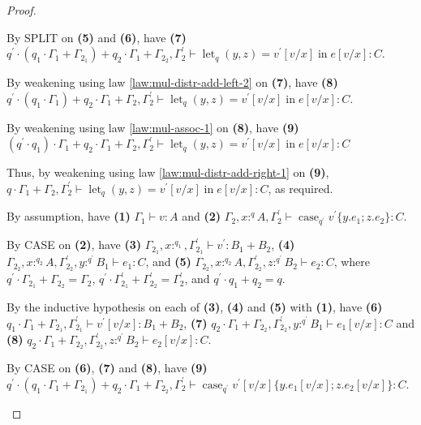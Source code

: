 \documentclass[acmsmall,screen,nonacm]{acmart}
\DeclareMathOperator{\llet}{\text{let}}
\DeclareMathOperator{\lin}{\text{in}}
\DeclareMathOperator{\case}{\text{case}}
\newcommand{\tee}{\vdash}
\begin{document}
\begin{proof}
\begin{description}
    By SPLIT on \textbf{(5)} and \textbf{(6)}, have \textbf{(7)} $q^\prime \cdot (q_1 \cdot \Gamma_1 + \Gamma_{2_1}) + q_2 \cdot \Gamma_1 + \Gamma_{2_2}, \Gamma_2^\prime \tee \llet_{q} (y, z) = v^\prime[v/x] \lin e[v/x] : C$.
    
    By weakening using law \ref{law:mul-distr-add-left-2} on \textbf{(7)}, have \textbf{(8)} $q^\prime \cdot (q_1 \cdot \Gamma_1) + q_2 \cdot \Gamma_1 + \Gamma_2, \Gamma_2^\prime \tee \llet_{q} (y, z) = v^\prime[v/x] \lin e[v/x] : C$.
    
    By weakening using law \ref{law:mul-assoc-1} on \textbf{(8)}, have \textbf{(9)}  $(q^\prime \cdot q_1) \cdot \Gamma_1 + q_2 \cdot \Gamma_1 + \Gamma_2, \Gamma_2^\prime \tee \llet_{q} (y, z) = v^\prime[v/x] \lin e[v/x] : C$

    Thus, by weakening using law \ref{law:mul-distr-add-right-1} on \textbf{(9)}, $q \cdot \Gamma_1 + \Gamma_2, \Gamma_2^\prime \tee \llet_{q} (y, z) = v^\prime[v/x] \lin e[v/x] : C$, as required.
    \\
    \item[Case CASE.] 
    By assumption, have \textbf{(1)} $\Gamma_1 \tee v : A$ and \textbf{(2)} $\Gamma_2, x :^q A, \Gamma_2^\prime \tee \case_{q^\prime} v^\prime\{y.e_1; z.e_2\} : C$.
    
    By CASE on \textbf{(2)}, have \textbf{(3)} $\Gamma_{2_1}, x :^{q_1}, \Gamma_{2_1}^\prime \tee v^\prime : B_1 + B_2$, \textbf{(4)} $\Gamma_{2_2}, x :^{q_2} A, \Gamma_{2_2}^\prime, y :^{q^\prime} B_1 \tee e_1 : C$, and \textbf{(5)} $\Gamma_{2_2}, x :^{q_2} A, \Gamma_{2_2}^\prime, z :^{q^\prime} B_2 \tee e_2 : C$,  where $q^\prime \cdot \Gamma_{2_1} + \Gamma_{2_2} = \Gamma_2$, $q^\prime \cdot \Gamma_{2_1}^\prime + \Gamma_{2_2}^\prime = \Gamma_2^\prime$, and $q^\prime \cdot q_1 + q_2 = q$.
    
    By the inductive hypothesis on each of \textbf{(3)}, \textbf{(4)} and \textbf{(5)} with \textbf{(1)}, have \textbf{(6)} $q_1 \cdot \Gamma_1 + \Gamma_{2_1}, \Gamma_{2_1}^\prime \tee v^\prime[v/x] : B_1 + B_2$, \textbf{(7)} $q_2 \cdot \Gamma_1 + \Gamma_{2_2}, \Gamma_{2_2}^\prime, y :^{q^\prime} B_1 \tee e_1[v/x] : C$ and \textbf{(8)} $q_2 \cdot \Gamma_1 + \Gamma_{2_2}, \Gamma_{2_2}^\prime, z :^{q^\prime} B_2 \tee e_2[v/x] : C$.

    By CASE on \textbf{(6)}, \textbf{(7)} and \textbf{(8)}, have \textbf{(9)} $q^\prime \cdot (q_1 \cdot \Gamma_1 + \Gamma_{2_1}) + q_2 \cdot \Gamma_1 + \Gamma_{2_2}, \Gamma_2^\prime \tee \case_{q^\prime} v^\prime[v/x] \{y.e_1[v/x]; z.e_2[v/x]\} : C$.
    

\end{description}
\end{proof}
\end{document}
